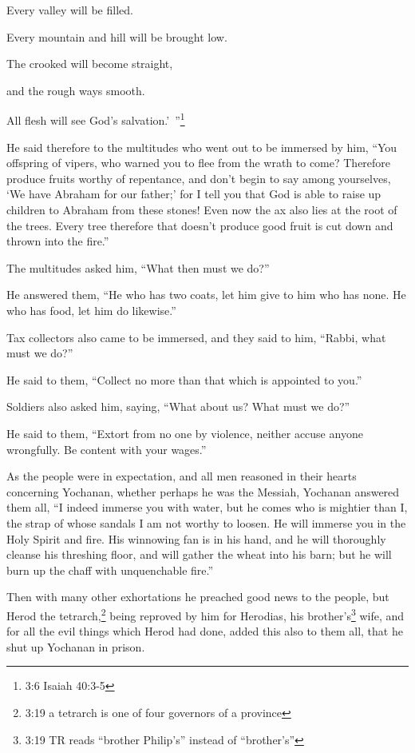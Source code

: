 \myverse{}Every valley will be filled.

Every mountain and hill will be brought low.

The crooked will become straight,

and the rough ways smooth.

\myverse{}All flesh will see God’s salvation.’ ”\footnote{ 3:6 Isaiah 40:3-5}

\myverse{}He said therefore to the multitudes who went out to be immersed
by him, “You offspring of vipers, who warned you to flee from the wrath to come?
\myverse{}Therefore produce fruits worthy of repentance, and don’t begin to say among
yourselves, ‘We have Abraham for our father;’ for I tell you that God is able to raise up children to
Abraham from these stones!
\myverse{}Even now the ax also lies at the root of the trees. Every tree therefore that
doesn’t produce good fruit is cut down and thrown into the fire.”

\myverse{}The multitudes asked him, “What then must we do?”

\myverse{}He answered them, “He who has two coats, let him give to him
who has none. He who has food, let him do likewise.”

\myverse{}Tax collectors also came to be immersed, and they said to him,
“Rabbi, what must we do?”

\myverse{}He said to them, “Collect no more than that which is appointed
to you.”

\myverse{}Soldiers also asked him, saying, “What about us? What must we
do?”

He said to them, “Extort from no one by violence, neither accuse anyone wrongfully. Be content
with your wages.”

\myverse{}As the people were in expectation, and all men reasoned in their
hearts concerning Yochanan, whether perhaps he was the Messiah,
\myverse{}Yochanan answered them all, “I indeed immerse you with water, but he comes
who is mightier than I, the strap of whose sandals I am not worthy to loosen. He will immerse you in the
Holy Spirit and fire.
\myverse{}His winnowing fan is in his hand, and he will thoroughly cleanse his threshing
floor, and will gather the wheat into his barn; but he will burn up the chaff with unquenchable fire.”

\myverse{}Then with many other exhortations he preached good news to the
people,
\myverse{}but Herod the tetrarch,\footnote{3:19 a tetrarch is one of four governors of a province} being reproved by him for Herodias,
his brother’s\footnote{3:19 TR reads “brother Philip’s” instead of “brother’s”} wife, and for all the evil things
which Herod had done,
\myverse{}added this also to them all, that he shut up Yochanan in prison.

